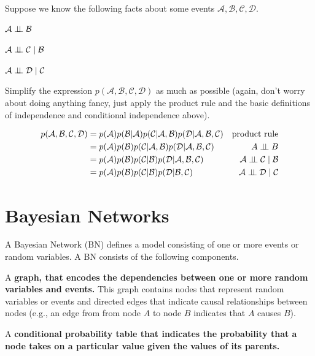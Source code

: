 \documentclass[review_Solutions]{subfiles}
\begin{document}
\begin{exercise}
Suppose we know the following facts about some events $\mathcal{A}, \mathcal{B}, \mathcal{C}, \mathcal{D}$.
\bi
\item $\mathcal{A} \perp\!\!\!\perp \mathcal{B}$
\item $\mathcal{A} \perp\!\!\!\perp \mathcal{C} \mid \mathcal{B}$
\item $\mathcal{A} \perp\!\!\!\perp \mathcal{D} \mid \mathcal{C}$
\ei

\noindent Simplify the expression $p(\mathcal{A}, \mathcal{B}, \mathcal{C}, \mathcal{D})$ as much as possible (again, don't worry about doing anything fancy, just apply the product rule and the basic definitions of independence and conditional independence above).

\begin{boxedsolution}
\begin{align}
p(\mathcal{A}, \mathcal{B}, \mathcal{C}, \mathcal{D}) &= p(\mathcal{A}) p(\mathcal{B}|\mathcal{A}) p(\mathcal{C} | \mathcal{A}, \mathcal{B}) p(\mathcal{D}|\mathcal{A}, \mathcal{B}, \mathcal{C}) & \mbox{product rule} \nonumber \\
&= p(\mathcal{A}) p(\mathcal{B})p(\mathcal{C} | \mathcal{A}, \mathcal{B}) p(\mathcal{D}|\mathcal{A}, \mathcal{B}, \mathcal{C}) & A \condindep B \nonumber \\
&= p(\mathcal{A}) p(\mathcal{B})p(\mathcal{C} |\mathcal{B}) p(\mathcal{D}|\mathcal{A}, \mathcal{B}, \mathcal{C}) & \mathcal{A} \condindep \mathcal{C} \mid \mathcal{B} \nonumber \\
&=  p(\mathcal{A}) p(\mathcal{B})p(\mathcal{C} |\mathcal{B}) p(\mathcal{D}| \mathcal{B}, \mathcal{C}) & \mathcal{A} \condindep \mathcal{D} \mid \mathcal{C}\nonumber
\end{align}
\end{boxedsolution}
\end{exercise}

\section{Bayesian Networks}

A Bayesian Network (BN) defines a model consisting of one or more events or random variables.  A BN consists of the following components.
\bi
\item A \textbf{graph, that encodes the dependencies between one or more random variables and events.}  This graph contains nodes that represent random variables or events and directed edges that indicate causal relationships between nodes (e.g., an edge from from node $A$ to node $B$ indicates that $A$ causes $B$).
\item A \textbf{conditional probability table that indicates the probability that a node takes on a particular value given the values of its parents.}
\ei
\end{document}
